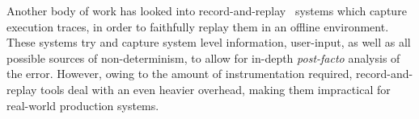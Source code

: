 Another body of work has looked into record-and-replay~\cite{odr,revirt,laadan2010transparent,geels2007friday} systems which capture execution traces, in order to faithfully replay them in an offline environment.
These systems try and capture system level information, user-input, as well as all possible sources of non-determinism, to allow for in-depth \textit{post-facto} analysis of the error.
However, owing to the amount of instrumentation required, record-and-replay tools deal with an even heavier overhead, making them impractical for real-world production systems.




